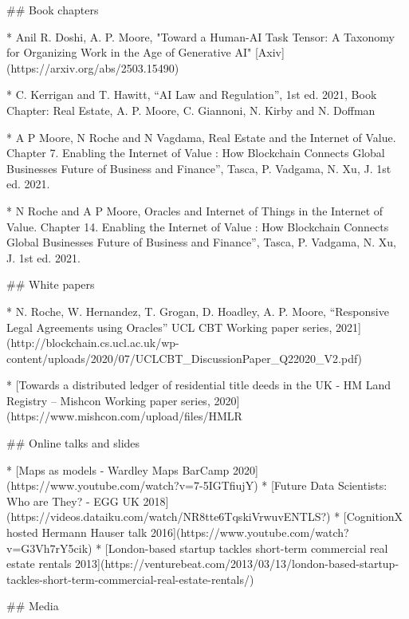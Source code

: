 ## Book chapters 

* Anil R. Doshi, A. P. Moore, "Toward a Human-AI Task Tensor: A Taxonomy for Organizing Work in the Age of Generative AI" [Axiv](https://arxiv.org/abs/2503.15490) 

* C. Kerrigan and T. Hawitt, “AI Law and Regulation”, 1st ed. 2021, Book Chapter: Real Estate, A. P. Moore, C. Giannoni, N. Kirby and N. Doffman

* A P Moore,  N Roche and N Vagdama, Real Estate and the Internet of Value. Chapter 7. Enabling the Internet of Value : How Blockchain Connects Global Businesses Future of Business and Finance”, Tasca, P. Vadgama, N. Xu, J. 1st ed. 2021.

* N Roche and A P Moore, Oracles and Internet of Things in the Internet of Value. Chapter 14. Enabling the Internet of Value : How Blockchain Connects Global Businesses Future of Business and Finance”, Tasca, P. Vadgama, N. Xu, J. 1st ed. 2021.

## White papers 

* N. Roche, W. Hernandez, T. Grogan, D. Hoadley, A. P. Moore, “Responsive Legal Agreements using Oracles” UCL CBT Working paper series, 2021](http://blockchain.cs.ucl.ac.uk/wp-content/uploads/2020/07/UCLCBT_DiscussionPaper_Q22020_V2.pdf)

* [Towards a distributed ledger of residential title deeds in the UK - HM Land Registry – Mishcon Working paper series, 2020](https://www.mishcon.com/upload/files/HMLR%

## Online talks and slides 

* [Maps as models - Wardley Maps BarCamp 2020](https://www.youtube.com/watch?v=7-5IGTfiujY)
* [Future Data Scientists: Who are They? - EGG UK 2018](https://videos.dataiku.com/watch/NR8tte6TqskiVrwuvENTLS?)
* [CognitionX hosted Hermann Hauser talk 2016](https://www.youtube.com/watch?v=G3Vh7rY5cik)
* [London-based startup tackles short-term commercial real estate rentals 2013](https://venturebeat.com/2013/03/13/london-based-startup-tackles-short-term-commercial-real-estate-rentals/)

## Media 

